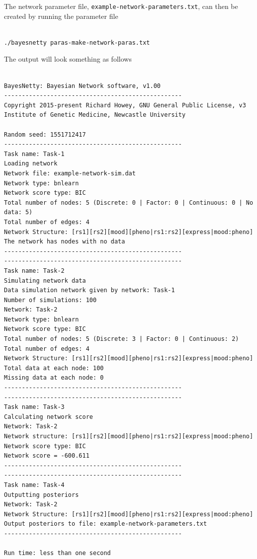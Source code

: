 \documentclass[a4paper,12pt]{article}
\newcommand{\code}[1]{{\footnotesize{{\tt #1}}}}
\begin{document}
The network parameter file, \code{example-network-parameters.txt}, can then be created by running the parameter file 
\vspace{0.35cm} \begin{lstlisting}

./bayesnetty paras-make-network-paras.txt

\end{lstlisting} \vspace{0.35cm}
The output will look something as follows 
\vspace{0.35cm} \begin{lstlisting}

BayesNetty: Bayesian Network software, v1.00
--------------------------------------------------
Copyright 2015-present Richard Howey, GNU General Public License, v3
Institute of Genetic Medicine, Newcastle University

Random seed: 1551712417
--------------------------------------------------
Task name: Task-1
Loading network
Network file: example-network-sim.dat
Network type: bnlearn
Network score type: BIC
Total number of nodes: 5 (Discrete: 0 | Factor: 0 | Continuous: 0 | No data: 5)
Total number of edges: 4
Network Structure: [rs1][rs2][mood][pheno|rs1:rs2][express|mood:pheno]
The network has nodes with no data
--------------------------------------------------
--------------------------------------------------
Task name: Task-2
Simulating network data
Data simulation network given by network: Task-1
Number of simulations: 100
Network: Task-2
Network type: bnlearn
Network score type: BIC
Total number of nodes: 5 (Discrete: 3 | Factor: 0 | Continuous: 2)
Total number of edges: 4
Network Structure: [rs1][rs2][mood][pheno|rs1:rs2][express|mood:pheno]
Total data at each node: 100
Missing data at each node: 0
--------------------------------------------------
--------------------------------------------------
Task name: Task-3
Calculating network score
Network: Task-2
Network structure: [rs1][rs2][mood][pheno|rs1:rs2][express|mood:pheno]
Network score type: BIC
Network score = -600.611
--------------------------------------------------
--------------------------------------------------
Task name: Task-4
Outputting posteriors
Network: Task-2
Network Structure: [rs1][rs2][mood][pheno|rs1:rs2][express|mood:pheno]
Output posteriors to file: example-network-parameters.txt
--------------------------------------------------

Run time: less than one second

\end{lstlisting} \vspace{0.35cm}
\end{document}
